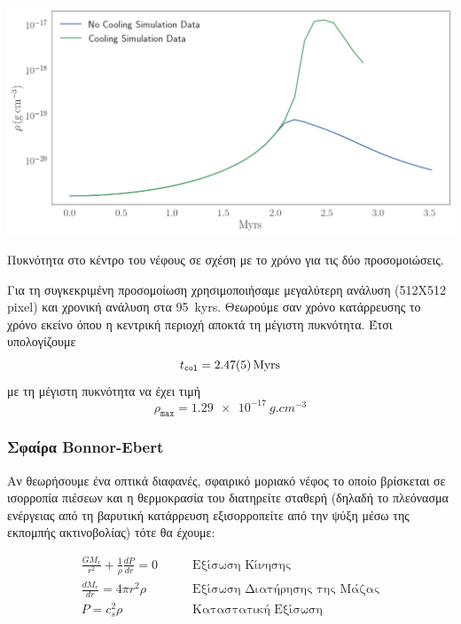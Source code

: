 \begin{marginfigure}
	\centering
	\includegraphics[width=1\linewidth]{DataImages/GRcenterTimeRHO}
	\caption{Πυκνότητα στο κέντρο του νέφους σε σχέση με το χρόνο για τις δύο προσομοιώσεις.}
	\label{fig:grcentertimerho}
\end{marginfigure}


Για τη συγκεκριμένη προσομοίωση χρησιμοποιήσαμε μεγαλύτερη ανάλυση (512X512 pixel) και χρονική ανάλυση στα \SI{95}{kyrs}. Θεωρούμε σαν χρόνο κατάρρευσης το χρόνο εκείνο όπου η κεντρική περιοχή αποκτά τη μέγιστη πυκνότητα. Έτσι υπολογίζουμε 
\begin{equation}
t_\mathtt{col}=\SI{2.47\pm 0.05}{Myrs}
\end{equation}
με τη μέγιστη πυκνότητα να έχει τιμή
\begin{equation}
\rho _\mathtt{max}=\SI{1.29e-17}{g.cm^{-3}}
\end{equation}


	
	\subsubsection{Σφαίρα Bonnor-Ebert}
	Αν θεωρήσουμε ένα οπτικά διαφανές, σφαιρικό μοριακό νέφος το οποίο βρίσκεται σε ισορροπία πιέσεων και η θερμοκρασία του διατηρείτε σταθερή (δηλαδή το πλεόνασμα ενέργειας από τη βαρυτική κατάρρευση εξισορροπείτε από την ψύξη μέσω της εκπομπής ακτινοβολίας) τότε θα έχουμε:

	\begin{align}
	\frac{GM_r}{r^2} +\frac{1}{\rho}\frac{dP}{dr}=0  &\qquad \text{Εξίσωση Κίνησης}\\
	\frac{dM_r}{dr} = 4 \pi r^2 \rho &\qquad \text{Εξίσωση Διατήρησης της Μάζας}\\
	P = c_s ^2 \rho &\qquad \text{Καταστατική Εξίσωση}
	\end{align}
	
